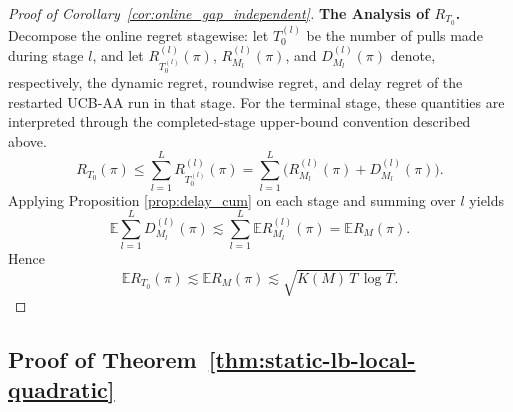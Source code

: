 \documentclass[
  12pt]{article}
\begin{document}
\begin{proof}[Proof of Corollary~\ref{cor:online_gap_independent}]
\textbf{The Analysis of $R_{T_0}$.} Decompose the online regret stagewise:
let \(T_0^{(l)}\) be the number of pulls made during stage \(l\), and let
\(R_{T_0^{(l)}}^{(l)}(\pi)\), \(R_{M_l}^{(l)}(\pi)\), and
\(D_{M_l}^{(l)}(\pi)\) denote, respectively, the dynamic regret, roundwise
regret, and delay regret of the restarted UCB-AA run in that stage. For the
terminal stage, these quantities are interpreted through the completed-stage
upper-bound convention described above.
\[
R_{T_0}(\pi)\le\sum_{l=1}^L R_{T_0^{(l)}}^{(l)}(\pi)
=\sum_{l=1}^L\bigl(R_{M_l}^{(l)}(\pi)+D_{M_l}^{(l)}(\pi)\bigr).
\]
Applying Proposition \ref{prop:delay_cum} on each stage and summing over \(l\) yields
\[
\mathbb{E}\sum_{l=1}^L D_{M_l}^{(l)}(\pi)
\lesssim
\sum_{l=1}^L \mathbb{E} R_{M_l}^{(l)}(\pi)
=
\mathbb{E} R_M(\pi).
\]
Hence
\[
\mathbb{E}R_{T_0}(\pi)\lesssim \mathbb{E}R_M(\pi)
\lesssim \sqrt{K(M)\,T\,\log T}.
\]
\end{proof}

\subsection{Proof of Theorem~\ref{thm:static-lb-local-quadratic}}
\label{sec:Proof of thm:static-lb-local-quadratic}
\end{document}
